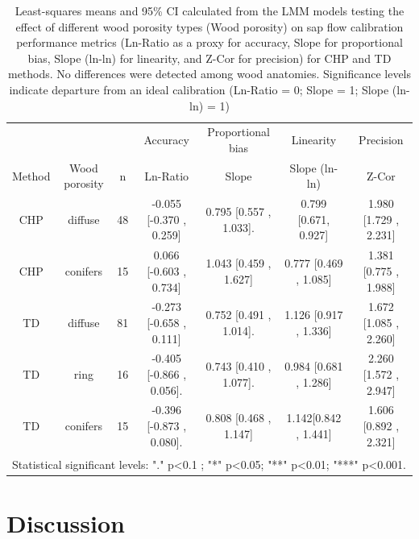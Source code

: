 \documentclass[11pt,twoside]{reedthesis}
\begin{document}
\begin{table}[!h]

\caption{\label{tab:Ch1T3}Least-squares means and 95\% CI calculated from the LMM models testing the effect of different wood porosity types (Wood porosity) on sap flow calibration performance metrics (Ln-Ratio as a proxy for accuracy, Slope for proportional bias, Slope (ln-ln) for linearity, and Z-Cor for precision) for CHP and TD methods. No differences were detected among wood anatomies. Significance levels indicate departure from an ideal calibration (Ln-Ratio = 0; Slope = 1; Slope (ln-ln) = 1)}
\centering
\fontsize{7}{9}\selectfont
\begin{tabular}[t]{ccccccc}
\toprule
\multicolumn{1}{c}{ } & \multicolumn{1}{c}{ } & \multicolumn{1}{c}{ } & \multicolumn{1}{c}{Accuracy} & \multicolumn{1}{c}{Proportional bias} & \multicolumn{1}{c}{Linearity} & \multicolumn{1}{c}{Precision} \\
\cmidrule(l{3pt}r{3pt}){4-4} \cmidrule(l{3pt}r{3pt}){5-5} \cmidrule(l{3pt}r{3pt}){6-6} \cmidrule(l{3pt}r{3pt}){7-7}
Method & Wood porosity & n & Ln-Ratio & Slope & Slope (ln-ln) & Z-Cor\\
\midrule
CHP & diffuse & 48 & -0.055 [-0.370 , 0.259] & 0.795 [0.557 , 1.033]. & 0.799 [0.671, 0.927] \*\* & 1.980 [1.729 , 2.231]\\
CHP & conifers & 15 & 0.066 [-0.603 , 0.734] & 1.043 [0.459 , 1.627] & 0.777 [0.469 , 1.085] & 1.381 [0.775 , 1.988]\\
TD & diffuse & 81 & -0.273 [-0.658 , 0.111] & 0.752 [0.491 , 1.014]. & 1.126 [0.917 , 1.336] & 1.672 [1.085 , 2.260]\\
TD & ring & 16 & -0.405 [-0.866 , 0.056]. & 0.743 [0.410 , 1.077]. & 0.984 [0.681 , 1.286] & 2.260 [1.572 , 2.947]\\
TD & conifers & 15 & -0.396 [-0.873 , 0.080]. & 0.808 [0.468 , 1.147] & 1.142[0.842 , 1.441] & 1.606 [0.892 , 2.321]\\
\bottomrule
\multicolumn{7}{l}{\textsuperscript{} Statistical significant levels: "." p<0.1 ; "*" p<0.05; "**" p<0.01; "***" p<0.001.}\\
\end{tabular}
\end{table}
\section{Discussion}\label{discussion}
\end{document}
